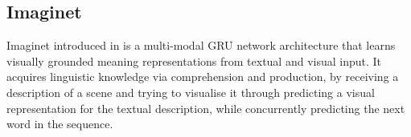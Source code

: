 


\subsection{Imaginet}
\label{sec:imaginet}



{\sc Imaginet} introduced in  is a
multi-modal GRU network architecture that learns visually grounded
meaning representations from textual and visual input.  It acquires 
linguistic knowledge via comprehension and production, by receiving a
description of a scene and trying to visualise it through predicting a visual
representation for the textual description, while concurrently predicting 
the next word in the sequence. 

